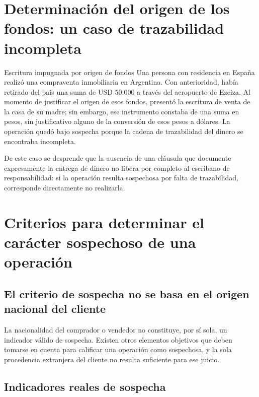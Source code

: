 \documentclass[12pt,oneside]{book}
\begin{document}
\section{Determinación del origen de los fondos: un caso de trazabilidad incompleta}

\begin{example}{Escritura impugnada por origen de fondos}
Una persona con residencia en España realizó una compraventa inmobiliaria en Argentina. Con anterioridad, había retirado del país una suma de USD 50.000 a través del aeropuerto de Ezeiza. Al momento de justificar el origen de esos fondos, presentó la escritura de venta de la casa de su madre; sin embargo, ese instrumento constaba de una suma en pesos, sin justificativo alguno de la conversión de esos pesos a dólares. La operación quedó bajo sospecha porque la cadena de trazabilidad del dinero se encontraba incompleta.
\end{example}

De este caso se desprende que la ausencia de una cláusula que documente expresamente la entrega de dinero no libera por completo al escribano de responsabilidad: si la operación resulta sospechosa por falta de trazabilidad, corresponde directamente no realizarla.

\section{Criterios para determinar el carácter sospechoso de una operación}

\subsection{El criterio de sospecha no se basa en el origen nacional del cliente}

La nacionalidad del comprador o vendedor no constituye, por sí sola, un indicador válido de sospecha. Existen otros elementos objetivos que deben tomarse en cuenta para calificar una operación como sospechosa, y la sola procedencia extranjera del cliente no resulta suficiente para ese juicio.

\subsection{Indicadores reales de sospecha}
\end{document}
